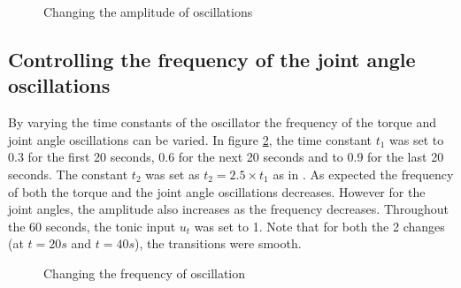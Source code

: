 \documentclass[12pt,twoside]{article}
\theoremstyle{plain}
\theoremstyle{definition}
\theoremstyle{remark}
\begin{document}
\begin{figure}[htbp]
\caption{Changing the amplitude of oscillations}
\label{fig:change-amp}
\end{figure}

\subsection{Controlling the frequency of the joint angle oscillations}
By varying the time constants of the oscillator the frequency of the torque and joint angle oscillations can be varied. In figure \ref{fig:change-freq}, the time constant $t_1$ was set to 0.3 for the first 20 seconds, 0.6 for the next 20 seconds and to 0.9 for the last 20 seconds. The constant $t_2$ was set as $t_2 = 2.5 \times t_1$ as in \cite{ronsse2009computational}. As expected the frequency of both the torque and the joint angle oscillations decreases. However for the joint angles, the amplitude also increases as the frequency decreases. Throughout the 60 seconds, the tonic input $u_t$ was set to 1. Note that for both the 2 changes (at $t=20s$ and $t=40s$), the transitions were smooth.

\begin{figure}[htbp]
\centering     %
{}
\caption{Changing the frequency of oscillation}
\label{fig:change-freq}
\end{figure}
\end{document}

